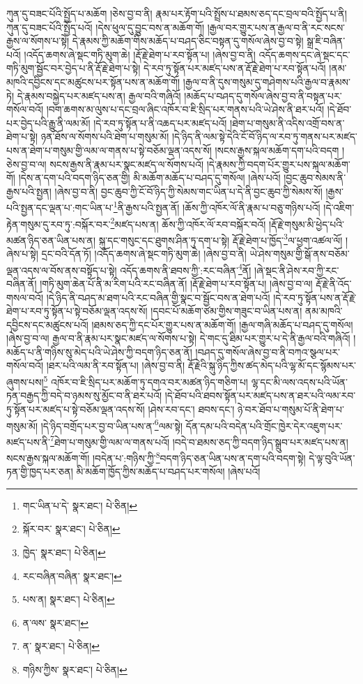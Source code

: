 ཀུན་དུ་བཟང་པོའི་སྤྱོད་པ་མཆོག །ཅེས་བྱ་བ་ནི། རྣམ་པར་རྟོག་པའི་སྤྲོས་པ་ཐམས་ཅད་དང་བྲལ་བའི་སྤྱོད་པ་ནི། ཀུན་དུ་བཟང་པོའི་སྤྱོད་པའོ། །དེས་ཕུལ་དུ་བྱུང་བས་ན་མཆོག་གོ། །རྒྱལ་བར་གྱུར་པས་ན་རྒྱལ་བ་ནི་རང་སངས་རྒྱས་ལ་སོགས་པ་སྟེ། དེ་རྣམས་ཀྱི་མཆོག་གིས་མཆོད་པ་བཤད་ཅིང་བསྟན་དུ་གསོལ་ཞེས་བྱ་བ་སྟེ། སྒྲ་ཇི་བཞིན་པའོ། །འདོད་ཆགས་ཞེ་སྡང་གཏི་མུག་ཆེ། །རྡོ་རྗེ་ཐེག་པ་རབ་སྟོན་པ། །ཞེས་བྱ་བ་ནི། འདོད་ཆགས་དང་ཞེ་སྡང་དང་གཏི་མུག་སྦྱོང་བར་བྱེད་པ་ནི་རྡོ་རྗེ་ཐེག་པ་སྟེ། དེ་རབ་ཏུ་སྟོན་པར་མཛད་པས་ན་རྡོ་རྗེ་ཐེག་པ་རབ་སྟོན་པའོ། །ནམ་མཁའི་དབྱིངས་དང་མཚུངས་པར་སྟོན་པས་ན་མཆོག་གོ། །རྒྱལ་བ་ནི་དུས་གསུམ་དུ་གཤེགས་པའི་རྒྱལ་བ་རྣམས་ཏེ། དེ་རྣམས་བསྐྱེད་པར་མཛད་པས་ན། རྒྱལ་བའི་གཞིའོ། །མཆོད་པ་བཤད་དུ་གསོལ་ཞེས་བྱ་བ་ནི་བསྟན་པར་གསོལ་བའོ། །བག་ཆགས་མ་ལུས་པ་དང་བྲལ་ཞིང་འཁོར་བ་ཇི་སྲིད་པར་གནས་པའི་ཡེ་ཤེས་ནི་ཐར་པའོ། །དེ་ཐོབ་པར་བྱེད་པའི་རྒྱུ་ནི་ལམ་མོ། །དེ་རབ་ཏུ་སྟོན་པ་ནི་འཆད་པར་མཛད་པའོ། །ཐེག་པ་གསུམ་ནི་འདིས་འགྲོ་བས་ན་ཐེག་པ་སྟེ། ཉན་ཐོས་ལ་སོགས་པའི་ཐེག་པ་གསུམ་མོ། །དེ་ཉིད་ནི་ལམ་སྟེ་དེའི་ངོ་བོ་ཉིད་ལ་རབ་ཏུ་གནས་པར་མཛད་པས་ན་ཐེག་པ་གསུམ་གྱི་ལམ་ལ་གནས་པ་སྟེ་བཅོམ་ལྡན་འདས་སོ། །སངས་རྒྱས་སྐལ་མཆོག་དག་པའི་བདག །ཅེས་བྱ་བ་ལ། སངས་རྒྱས་ནི་རྣམ་པར་སྣང་མཛད་ལ་སོགས་པའོ། །དེ་རྣམས་ཀྱི་བདག་པོར་གྱུར་པས་སྐལ་མཆོག་གོ། །དེས་ན་དག་པའི་བདག་ཉིད་ཅན་གྱི། མི་མཆོག་མཆོད་པ་བཤད་དུ་གསོལ། །ཞེས་པའོ། །བྱང་ཆུབ་སེམས་ནི་རྒྱས་པའི་སྤྱན། །ཞེས་བྱ་བ་ནི། བྱང་ཆུབ་ཀྱི་ངོ་བོ་ཉིད་ཀྱི་སེམས་གང་ཡིན་པ་དེ་ནི་བྱང་ཆུབ་ཀྱི་སེམས་སོ། །རྒྱས་པའི་སྤྱན་དང་ལྡན་པ་:གང་ཡིན་པ་\footnote{གང་ཡིན་པ་དེ་  སྣར་ཐང་།  པེ་ཅིན། }ནི་རྒྱས་པའི་སྤྱན་ནོ། །ཆོས་ཀྱི་འཁོར་ལོ་ནི་རྣམ་པ་བཅུ་གཉིས་པའོ། །དེ་འཇིག་རྟེན་གསུམ་དུ་རབ་ཏུ་:བསྐོར་བར་\footnote{སྐོར་བར་  སྣར་ཐང་།  པེ་ཅིན། }མཛད་པས་ན། ཆོས་ཀྱི་འཁོར་ལོ་རབ་བསྐོར་བའོ། །རྡོ་རྗེ་གསུམ་མི་ཕྱེད་པའི་མཚན་ཉིད་ཅན་ཡིན་པས་ན། སྐུ་དང་གསུང་དང་ཐུགས་ཤིན་ཏུ་དག་པ་སྟེ། རྡོ་རྗེ་ཐེག་པ་ཁྱོད་\footnote{ཁྱེད་  སྣར་ཐང་།  པེ་ཅིན། }ལ་ཕྱག་འཚལ་ལོ། །ཞེས་པ་སྟེ། དྲང་བའི་དོན་ཏོ། །འདོད་ཆགས་ཞེ་སྡང་གཏི་མུག་ཆེ། །ཞེས་བྱ་བ་ནི། ཡེ་ཤེས་གསུམ་གྱི་སྒོ་ནས་བཅོམ་ལྡན་འདས་ལ་བོས་ནས་བསྟོད་པ་སྟེ། འདོད་ཆགས་ནི་ཐབས་ཀྱི་:རང་བཞིན་\footnote{རང་བཞིན་བཞིན་  སྣར་ཐང་། }ནོ། །ཞེ་སྡང་ནི་ཤེས་རབ་ཀྱི་རང་བཞིན་ནོ། །གཏི་མུག་ཆེན་པོ་ནི་མ་རིག་པའི་རང་བཞིན་ནོ། །རྡོ་རྗེ་ཐེག་པ་རབ་སྟོན་པ། །ཞེས་བྱ་བ་ལ། རྡོ་རྗེ་ནི་འོད་གསལ་བའོ། །དེ་ཉིད་ནི་བཤད་མ་ཐག་པའི་རང་བཞིན་གྱི་སྣང་བ་སྦྱོང་བས་ན་ཐེག་པའོ། །དེ་རབ་ཏུ་སྟོན་པས་ན་རྡོ་རྗེ་ཐེག་པ་རབ་ཏུ་སྟོན་པ་སྟེ་བཅོམ་ལྡན་འདས་སོ། །དབང་པོ་མཆོག་ཙམ་གྱིས་གཟུང་བ་ཡིན་པས་ན། ནམ་མཁའི་དབྱིངས་དང་མཚུངས་པའོ། །ཐམས་ཅད་ཀྱི་དང་པོར་གྱུར་པས་ན་མཆོག་གོ། །རྒྱལ་གཞི་མཆོད་པ་བཤད་དུ་གསོལ། །ཞེས་བྱ་བ་ལ། རྒྱལ་བ་ནི་རྣམ་པར་སྣང་མཛད་ལ་སོགས་པ་སྟེ། དེ་གང་དུ་ཐིམ་པར་གྱུར་པ་དེ་ནི་རྒྱལ་བའི་གཞིའོ། །མཆོད་པ་ནི་གཉིས་སུ་མེད་པའི་ཡེ་ཤེས་ཀྱི་བདག་ཉིད་ཅན་ནོ། །བཤད་དུ་གསོལ་ཞེས་བྱ་བ་ནི་བཀའ་སྩལ་པར་གསོལ་བའོ། །ཐར་པའི་ལམ་ནི་རབ་སྟོན་པ། །ཞེས་བྱ་བ་ནི། རྡོ་རྗེའི་སྐུ་ཉིད་ཀྱིས་ཚད་མེད་པའི་ལྷ་མོ་དང་སྙོམས་པར་ཞུགས་པས།\footnote{པས་ན།  སྣར་ཐང་།  པེ་ཅིན། } འཁོར་བ་ཇི་སྲིད་པར་མཆོག་ཏུ་དགའ་བར་མཚན་ཉིད་གཅིག་པ། ལྷ་དང་མི་ལས་འདས་པའི་ཡོན་ཏན་བརྒྱད་ཀྱི་བདེ་བ་ཉམས་སུ་མྱོང་བ་ནི་ཐར་པའོ། །དེ་ཐོབ་པའི་ཐབས་སྟོན་པར་མཛད་པས་ན་ཐར་པའི་ལམ་རབ་ཏུ་སྟོན་པར་མཛད་པ་སྟེ་བཅོམ་ལྡན་འདས་སོ། །ཤེས་རབ་དང་། ཐབས་དང་། ཉེ་བར་ཐོབ་པ་གསུམ་པོ་ནི་ཐེག་པ་གསུམ་མོ། །དེ་ཉིད་བགྲོད་པར་བྱ་བ་ཡིན་པས་ན་\footnote{ན་ལས་  སྣར་ཐང་། }ལམ་སྟེ། དོན་དམ་པའི་བདེན་པའི་གྲོང་ཁྱེར་དེར་འཇུག་པར་མཛད་པས་ནི་\footnote{ན་  སྣར་ཐང་།  པེ་ཅིན། }ཐེག་པ་གསུམ་གྱི་ལམ་ལ་གནས་པའོ། །བདེ་བ་ཐམས་ཅད་ཀྱི་བདག་ཉིད་སྒྲུབ་པར་མཛད་པས་ན། སངས་རྒྱས་སྐལ་མཆོག་གོ། །བདེན་པ་:གཉིས་ཀྱི་\footnote{གཉིས་ཀྱིས་  སྣར་ཐང་།  པེ་ཅིན། }བདག་ཉིད་ཅན་ཡིན་པས་ན་དག་པའི་བདག་སྟེ། དེ་ལྟ་བུའི་ཡོན་ཏན་གྱི་ཁྱད་པར་ཅན། མི་མཆོག་ཁྱོད་ཀྱིས་མཆོད་པ་བཤད་པར་གསོལ། །ཞེས་པའོ། 